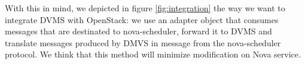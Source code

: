 With this in mind, we depicted in figure \ref{fig:integration} the way we want 
to integrate DVMS with OpenStack: we use an adapter object that consumes 
messages that are destinated to nova-scheduler, forward it to DVMS and translate
messages produced by DMVS in message from the nova-scheduler protocol. We think
that this method will minimize modification on Nova service.

